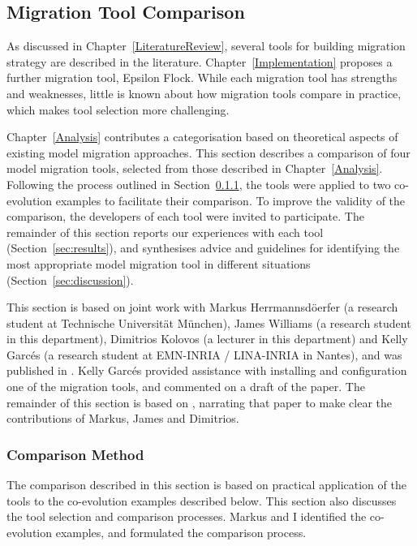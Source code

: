 
\subsection{Migration Tool Comparison}
As discussed in Chapter~\ref{LiteratureReview}, several tools for building migration strategy are described in the literature. Chapter~\ref{Implementation} proposes a further migration tool, Epsilon Flock. While each migration tool has strengths and weaknesses, little is known about how migration tools compare in practice, which makes tool selection more challenging.

Chapter~\ref{Analysis} contributes a categorisation based on theoretical aspects of existing model migration approaches. This section describes a comparison of four model migration tools, selected from those described in Chapter~\ref{Analysis}. Following the process outlined in Section~\ref{sec:method}, the tools were applied to two co-evolution examples to facilitate their comparison. To improve the validity of the comparison, the developers of each tool were invited to participate. The remainder of this section reports our experiences with each tool (Section~\ref{sec:results}), and synthesises advice and guidelines for identifying the most appropriate model migration tool in different situations (Section~\ref{sec:discussion}).

This section is based on joint work with Markus Herrmannsd\"{o}erfer (a research student at Technische Universit\"at M\"unchen), James Williams (a research student in this department), Dimitrios Kolovos (a lecturer in this department) and Kelly Garc\'{e}s (a research student at EMN-INRIA / LINA-INRIA in Nantes), and was published in \cite{rose10comparison}. Kelly Garc\'{e}s provided assistance with installing and configuration one of the migration tools, and commented on a draft of the paper. The remainder of this section is based on \cite{rose10comparison}, narrating that paper to make clear the contributions of Markus, James and Dimitrios.  


\subsubsection{Comparison Method}
\label{sec:method}

\newcommand{\mm}[1]{\texttt{#1}}
The comparison described in this section is based on practical application of the tools to the co-evolution examples described below. This section also discusses the tool selection and comparison processes. Markus and I identified the co-evolution examples, and formulated the comparison process.

